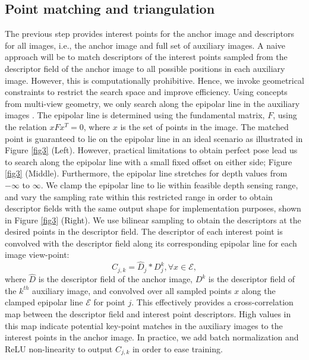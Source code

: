 \documentclass[runningheads]{llncs}
\begin{document}
\subsection{Point matching and triangulation}
The previous step provides interest points for the anchor image and descriptors for all images, i.e., the anchor image and full set of auxiliary images. A naive approach will be to match descriptors of the interest points sampled from the descriptor field of the anchor image to all possible positions in each auxiliary image. However, this is computationally prohibitive. Hence, we invoke geometrical constraints to restrict the search space and improve efficiency. Using concepts from multi-view geometry, we only search along the epipolar line in the auxiliary images \cite{hartley2003multiple}. The epipolar line is determined using the fundamental matrix, $F$, using the relation $xFx^{T}=0$, where $x$ is the set of points in the image. The matched point is guaranteed to lie on the epipolar line in an ideal scenario as illustrated in Figure \ref{fig3} (Left). However, practical limitations to obtain perfect pose lead us to search along the epipolar line with a small fixed offset on either side; Figure \ref{fig3} (Middle). Furthermore, the epipolar line stretches for depth values from  $-\infty$  to $\infty$. We clamp the epipolar line to lie within feasible depth sensing range, and vary the sampling rate within this restricted range in order to obtain descriptor fields with the same output shape for implementation purposes, shown in Figure \ref{fig3} (Right). We use bilinear sampling to obtain the descriptors at the desired points in the descriptor field. The descriptor of each interest point is convolved with the descriptor field along its corresponding epipolar line for each image view-point:
\begin{equation}\label{advce}
  C_{j,k} = \hat D_{j} \ast D^k_{j},  \forall x \in \mathcal{E},
\end{equation}
where $\hat D$ is the descriptor field of the anchor image, $D^k$ is the descriptor field of the $k^{th}$ auxiliary image, and convolved over all sampled points $x$ along the clamped epipolar line $\mathcal{E}$ for point $j$.  This effectively provides a cross-correlation map \cite{bertinetto2016fully} between the descriptor field and interest point descriptors. High values in this map indicate potential key-point matches in the auxiliary images to the interest points in the anchor image. In practice, we add batch normalization \cite{ioffe2015batch} and ReLU non-linearity \cite{krizhevsky2012imagenet} to output $C_{j,k}$ in order to ease training. 
\end{document}
